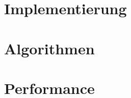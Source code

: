 \documentclass[ngerman
  ,fontsize=11pt %
  ,numbers=noenddot %
  ,parskip=half*
  ,openany
  ,DIV=10
  ,fleqn %
  ,oneside
]{./myClass}
\begin{document}
\ifnum{}
  \frontmatter
  
  \newpage \thispagestyle{empty} \mbox{}
\else
  \mainmatter
\fi

\tableofcontents{}


\ifnum{}
  \mainmatter
\fi

\chapter{Implementierung}



\chapter{Algorithmen}


\chapter{Performance}


%

\pagebreak
\appendix
{}



\end{document}

